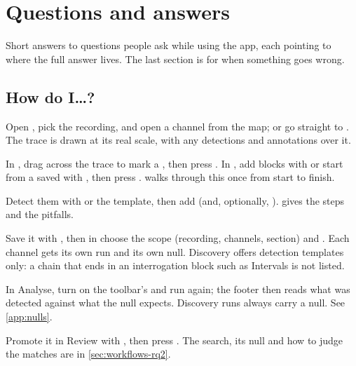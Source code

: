 \chapter{Questions and answers}\label{ch:faq}
Short answers to questions people ask while using the app, each pointing to where the full
answer lives. The last section is for when something goes wrong.

\section{How do I\ldots?}\label{sec:faq-how}

Open , pick the recording, and open a channel from the map; or go
straight to . The trace is drawn at its real scale, with any
detections and annotations over it.

In , drag across the trace to mark a , then press
. In , add blocks with  or
start from a saved  with , then press .
 walks through this once from start to finish.

Detect them with  or the  template, then
add  (and, optionally, ).
 gives the steps and the pitfalls.

Save it with , then in  choose the scope (recording,
channels, section) and . Each channel gets its own run and its own
null. Discovery offers detection templates only: a chain that ends in an interrogation block
such as Intervals is not listed.

In Analyse, turn on the toolbar's  and run again; the footer then reads
what was detected against what the null expects. Discovery runs always carry a null. See
\cref{app:nulls}.

Promote it in Review with , then press . The search, its
null and how to judge the matches are in \cref{sec:workflows-rq2}.

